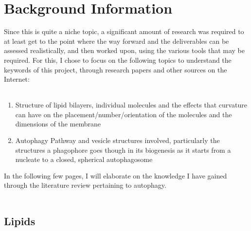 \documentclass[12pt, a4paper]{report}
\begin{document}


\newpage 
\section*{Background Information} 


Since this is quite a niche topic, a significant amount of research was required to at least get to the point where the way forward and the deliverables can be assessed realistically, and then worked upon, using the various tools that may be required. For this, I chose to focus on the following topics to understand the keywords of this project, through research papers and other sources on the Internet: 
\\~\\ 
\begin{enumerate}
\item Structure of lipid bilayers, individual molecules and the effects that curvature can have on the placement/number/orientation of the molecules and the dimensions of the membrane 
\item Autophagy Pathway and vesicle structures involved, particularly the structures a phagophore goes though in its biogenesis as it starts from a nucleate to a closed, spherical autophagosome 
\end{enumerate}

In the following few pages, I will elaborate on the knowledge I have gained through the literature review pertaining to autophagy. \\~\\


\subsection*{Lipids} 
\end{document}
